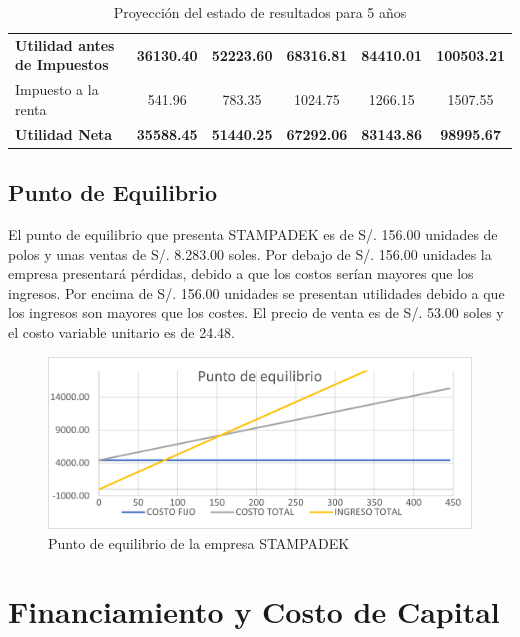 \documentclass[a4paper,openright,12pt]{book}
\begin{document}
\begin{table}[H]
{\begin{tabular}{lccccc}
\textbf{Utilidad antes de Impuestos} & \textbf{36130.40}  & \textbf{52223.60}  & \textbf{68316.81}  & \textbf{84410.01}  & \textbf{100503.21} \\
Impuesto a la renta                  & 541.96             & 783.35             & 1024.75            & 1266.15            & 1507.55            \\
\textbf{Utilidad Neta}               & \textbf{35588.45}  & \textbf{51440.25}  & \textbf{67292.06}  & \textbf{83143.86}  & \textbf{98995.67}  \\ \hline
\end{tabular}
}
\caption{Proyección del estado de resultados para 5 años}
\label{Tabla10}
\end{table}

\section{Punto de Equilibrio}

El punto de equilibrio que presenta STAMPADEK es de S/. 156.00 unidades de polos y unas ventas de S/. 8.283.00 soles. Por debajo de S/. 156.00 unidades la empresa presentará pérdidas, debido a que los costos serían mayores que los ingresos. Por encima de S/. 156.00 unidades se presentan utilidades debido a que los ingresos son mayores que los costes. El precio de venta es de S/. 53.00 soles y el costo variable unitario es de 24.48.

\begin{figure}[h]
\centering
\raggedright
\includegraphics[scale=1.2]{Figuras/PuntoEquilibrio.png}
\caption{Punto de equilibrio de la empresa STAMPADEK}
\label{figura4}
\end{figure}


\chapter{Financiamiento y Costo de Capital}\label{cap.4}
\end{document}
